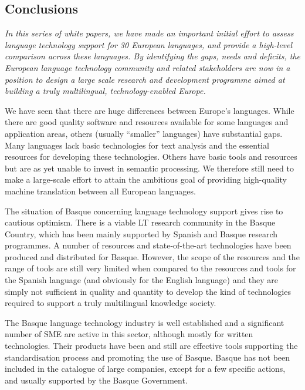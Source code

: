 \begin{multicols}{2}
\subsection{Conclusions}

    \emph{In this series of white papers, we have made an important initial effort to assess language technology support for 30 European languages, and provide a high-level comparison across these languages. By identifying the gaps, needs and deficits, the European language technology community and related stakeholders are now in a position to design a large scale research and development programme aimed at building a truly multilingual, technology-enabled Europe.}

    We have seen that there are huge differences between Europe’s languages. While there are good quality software and resources available for some languages and application areas, others (usually “smaller” languages) have substantial gaps. Many languages lack basic technologies for text analysis and the essential resources for developing these technologies. Others have basic tools and resources but are as yet unable to invest in semantic processing. We therefore still need to make a large-scale effort to attain the ambitious goal of providing high-quality machine translation between all European languages.

   The situation of Basque concerning language technology support gives rise to cautious optimism. There is a viable LT research community in the Basque Country, which has been mainly supported by Spanish and Basque research programmes. A number of resources and state-of-the-art technologies have been produced and distributed for Basque. However, the scope of the resources and the range of tools are still very limited when compared to the resources and tools for the Spanish language (and obviously for the English language) and they are simply not sufficient in quality and quantity to develop the kind of technologies required to support a truly multilingual knowledge society.

    The Basque language technology industry is well established and a significant number of SME are active in this sector, although mostly for written technologies.  Their products have been and still are effective tools supporting the standardisation process and promoting the use of Basque.  Basque has not been included in the catalogue of large companies, except for a few specific actions, and usually supported by the Basque Government. 


\end{multicols}
